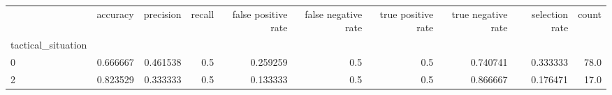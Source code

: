 \begin{tabular}{lrrrrrrrrr}
\toprule
{} &  accuracy &  precision &  recall &  false positive rate &  false negative rate &  true positive rate &  true negative rate &  selection rate &  count \\
tactical\_situation &           &            &         &                      &                      &                     &                     &                 &        \\
\midrule
0                  &  0.666667 &   0.461538 &     0.5 &             0.259259 &                  0.5 &                 0.5 &            0.740741 &        0.333333 &   78.0 \\
2                  &  0.823529 &   0.333333 &     0.5 &             0.133333 &                  0.5 &                 0.5 &            0.866667 &        0.176471 &   17.0 \\
\bottomrule
\end{tabular}
